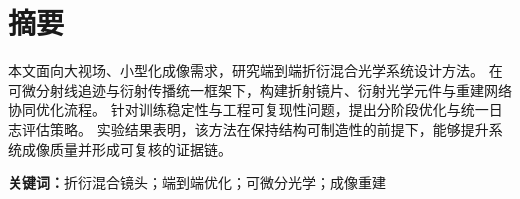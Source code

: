 \chapter*{摘\quad 要}

本文面向大视场、小型化成像需求，研究端到端折衍混合光学系统设计方法。
在可微分射线追迹与衍射传播统一框架下，构建折射镜片、衍射光学元件与重建网络协同优化流程。
针对训练稳定性与工程可复现性问题，提出分阶段优化与统一日志评估策略。
实验结果表明，该方法在保持结构可制造性的前提下，能够提升系统成像质量并形成可复核的证据链。

\noindent\textbf{关键词：}折衍混合镜头；端到端优化；可微分光学；成像重建
